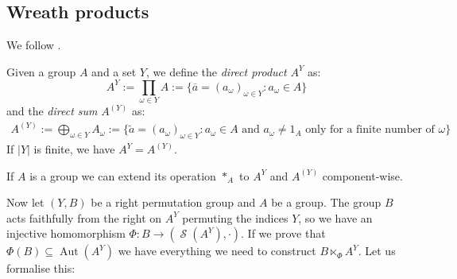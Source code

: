 \documentclass[mat1]{fmfdeloTS2.0}
\DeclareMathOperator{\aut}{\mathrm{Aut}}		%
\DeclareMathOperator{\symm}{\mathcal{S}}		%
\begin{document}
\subsection{Wreath products}\label{subsec:wreath prod}
We follow \cite{10}.

\begin{definition}
Given a group $A$ and a set $Y$, we define the \emph{direct product} $A^Y$ as:
\[A^Y := \prod_{\omega\in Y} A:=\{ \overline{a}=(a_\omega )_{\omega\in Y} : a_\omega\in A\}\]
and the \emph{direct sum} $A^{(Y)}$ as:
\begin{align*}
A^{(Y)} :=\bigoplus_{\omega\in Y}A_\omega:=\{ \widetilde{a}=(a_\omega )_{\omega\in Y} : a_\omega\in A \text{ and }a_\omega\neq 1_A\text{ only for a finite number of }\omega \} 
\end{align*}
If $|Y|$ is finite, we have $A^Y=A^{(Y)}$.
\end{definition}

\begin{remark}
If $A$ is a group we can extend its operation $*_A$ to $A^Y$ and $A^{(Y)}$ component-wise.
\end{remark}

Now let $(Y,B)$ be a right permutation group and $A$ be a group. The group $B$ acts faithfully from the right on $A^Y$ permuting the indices $Y$, so we have an injective homomorphism $\Phi: B\longrightarrow (\symm(A^Y),\cdot)$. If we prove that $\Phi(B)\subseteq\aut(A^Y)$ we have everything we need to construct $B\ltimes_\Phi A^{Y}$. Let us formalise this:
\end{document}
